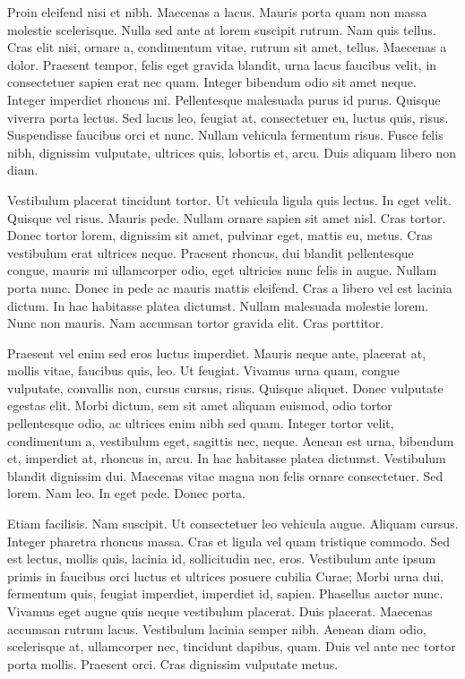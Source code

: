 \documentclass[../hdr.tex]{subfiles}
\begin{document}
Proin eleifend nisi et nibh. Maecenas a lacus. Mauris porta quam non massa
molestie scelerisque. Nulla sed ante at lorem suscipit rutrum. Nam quis tellus.
Cras elit nisi, ornare a, condimentum vitae, rutrum sit amet, tellus. Maecenas a
dolor. Praesent tempor, felis eget gravida blandit, urna lacus faucibus velit,
in consectetuer sapien erat nec quam. Integer bibendum odio sit amet neque.
Integer imperdiet rhoncus mi. Pellentesque malesuada purus id purus. Quisque
viverra porta lectus. Sed lacus leo, feugiat at, consectetuer eu, luctus quis,
risus. Suspendisse faucibus orci et nunc. Nullam vehicula fermentum risus. Fusce
felis nibh, dignissim vulputate, ultrices quis, lobortis et, arcu. Duis aliquam
libero non diam.

Vestibulum placerat tincidunt tortor. Ut vehicula ligula quis lectus. In eget
velit. Quisque vel risus. Mauris pede. Nullam ornare sapien sit amet nisl. Cras
tortor. Donec tortor lorem, dignissim sit amet, pulvinar eget, mattis eu, metus.
Cras vestibulum erat ultrices neque. Praesent rhoncus, dui blandit pellentesque
congue, mauris mi ullamcorper odio, eget ultricies nunc felis in augue. Nullam
porta nunc. Donec in pede ac mauris mattis eleifend. Cras a libero vel est
lacinia dictum. In hac habitasse platea dictumst. Nullam malesuada molestie
lorem. Nunc non mauris. Nam accumsan tortor gravida elit. Cras porttitor.

Praesent vel enim sed eros luctus imperdiet. Mauris neque ante, placerat at,
mollis vitae, faucibus quis, leo. Ut feugiat. Vivamus urna quam, congue
vulputate, convallis non, cursus cursus, risus. Quisque aliquet. Donec vulputate
egestas elit. Morbi dictum, sem sit amet aliquam euismod, odio tortor
pellentesque odio, ac ultrices enim nibh sed quam. Integer tortor velit,
condimentum a, vestibulum eget, sagittis nec, neque. Aenean est urna, bibendum
et, imperdiet at, rhoncus in, arcu. In hac habitasse platea dictumst. Vestibulum
blandit dignissim dui. Maecenas vitae magna non felis ornare consectetuer. Sed
lorem. Nam leo. In eget pede. Donec porta.

Etiam facilisis. Nam suscipit. Ut consectetuer leo vehicula augue. Aliquam
cursus. Integer pharetra rhoncus massa. Cras et ligula vel quam tristique
commodo. Sed est lectus, mollis quis, lacinia id, sollicitudin nec, eros.
Vestibulum ante ipsum primis in faucibus orci luctus et ultrices posuere cubilia
Curae; Morbi urna dui, fermentum quis, feugiat imperdiet, imperdiet id, sapien.
Phasellus auctor nunc. Vivamus eget augue quis neque vestibulum placerat. Duis
placerat. Maecenas accumsan rutrum lacus. Vestibulum lacinia semper nibh. Aenean
diam odio, scelerisque at, ullamcorper nec, tincidunt dapibus, quam. Duis vel
ante nec tortor porta mollis. Praesent orci. Cras dignissim vulputate metus.
\end{document}
